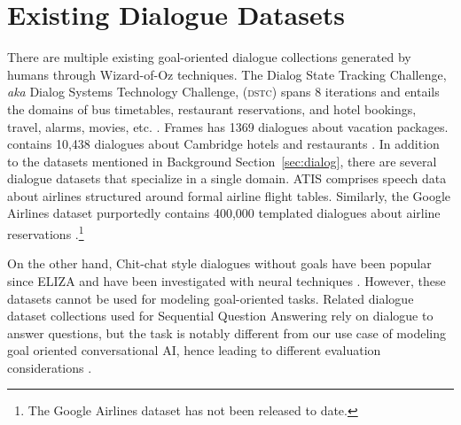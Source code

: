 \section{Existing Dialogue Datasets}


There are multiple existing goal-oriented dialogue collections generated by humans through Wizard-of-Oz techniques.  The Dialog State Tracking Challenge, \textit{aka} Dialog Systems Technology Challenge, (\textsc{dstc}) spans 8 iterations and entails the domains of bus timetables, restaurant reservations, and hotel bookings, travel, alarms, movies, etc. \citep{williams2016dialog}.  Frames \citep{asri2017frames} has 1369 dialogues about vacation packages.  \multiwoz contains 10,438 dialogues about Cambridge hotels and restaurants \citep{budzianowski2018multiwoz}. 
In addition to the datasets mentioned in Background Section~\ref{sec:dialog}, there are several dialogue datasets that specialize in a single domain. ATIS \citep{hemphill1990atis} comprises speech data about airlines structured around formal airline flight tables.  Similarly, the Google Airlines dataset purportedly contains 400,000 templated dialogues about airline reservations \citep{wei2018airdialogue}.\footnote{The Google Airlines dataset has not been released to date.}   %

On the other hand, Chit-chat style dialogues without goals have been popular since ELIZA and have been investigated with neural techniques \citep{weizenbaum1966eliza, li2016deep, li2017adversarial}.  
%
However, these datasets cannot be used for modeling goal-oriented tasks. 
%
Related dialogue dataset collections used for Sequential Question Answering rely on dialogue to answer questions, but the task is notably different from our use case of modeling goal oriented conversational AI, hence leading to different evaluation considerations \citep{choi2018quac,reddy2019coqa}.